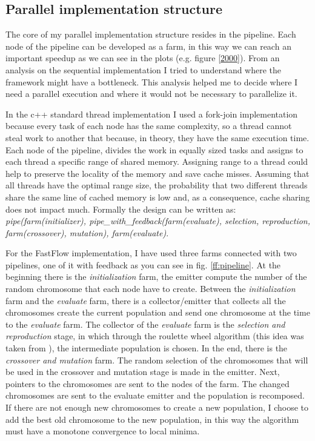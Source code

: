\documentclass[a4paper,10pt]{article}
\begin{document}
	\subsection{Parallel implementation structure}
	The core of my parallel implementation structure resides in the pipeline. Each node of the pipeline can be developed as a farm, in this way we can reach an important speedup as we can see in the plots (e.g. figure \ref{2000}). From an analysis on the sequential implementation I tried to understand where the framework might have a bottleneck. This analysis helped me to decide where I need a parallel execution and where it would not be necessary to parallelize it. 
	
	In the c++ standard thread implementation I used a fork-join implementation because every task of each node has the same complexity, so a thread cannot steal work to another that because, in theory, they have the same execution time. Each node of the pipeline, divides the work in equally sized tasks and assigns to each thread a specific range of shared memory. Assigning range to a thread could help to preserve the locality of the memory and save cache misses. Assuming that all threads have the optimal range size, the probability that two different threads share the same line of cached memory is low and, as a consequence, cache sharing does not impact much. Formally the design can be written as: \textit{pipe(farm(initializer), pipe\_with\_feedback(farm(evaluate), selection, reproduction, farm(crossover), mutation), farm(evaluate)}.
	
	For the FastFlow implementation, I have used three farms connected with two pipelines, one of it with feedback as you can see in fig. \ref{ff:pipeline}. At the beginning there is the \textit{initialization} farm, the emitter compute the number of the random chromosome that each node have to create. Between the \textit{initialization} farm and the \textit{evaluate} farm, there is a collector/emitter that collects all the chromosomes create the current population and send one chromosome at the time to the \textit{evaluate} farm. The collector of the \textit{evaluate} farm is the \textit{selection and reproduction} stage, in which through the roulette wheel algorithm (this idea was taken from \cite{GAT}), the intermediate population is chosen. In the end, there is the \textit{crossover and mutation} farm. The random selection of the chromosomes that will be used in the crossover and mutation stage is made in the emitter. Next, pointers to the chromosomes are sent to the nodes of the farm. The changed chromosomes are sent to the evaluate emitter and the population is recomposed. If there are not enough new chromosomes to create a new population, I choose to add the best old chromosome to the new population, in this way the algorithm must have a monotone convergence to local minima.
	
\end{document}
